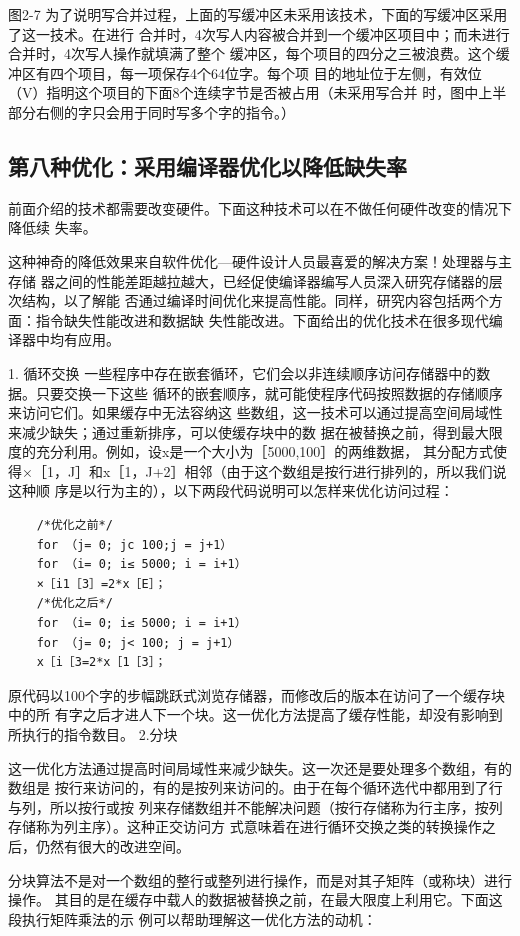 图2-7 为了说明写合并过程，上面的写缓冲区未采用该技术，下面的写缓冲区采用了这一技术。在进行
合并时，4次写人内容被合并到一个缓冲区项目中；而未进行合并时，4次写人操作就填满了整个
缓冲区，每个项目的四分之三被浪费。这个缓冲区有四个项目，每一项保存4个64位字。每个项
目的地址位于左侧，有效位（V）指明这个项目的下面8个连续字节是否被占用（未采用写合并
时，图中上半部分右侧的字只会用于同时写多个字的指令。）

\subsection{第八种优化：采用编译器优化以降低缺失率}
前面介绍的技术都需要改变硬件。下面这种技术可以在不做任何硬件改变的情况下降低续
失率。

这种神奇的降低效果来自软件优化—硬件设计人员最喜爱的解决方案！处理器与主存储
器之间的性能差距越拉越大，已经促使编译器编写人员深入研究存储器的层次结构，以了解能
否通过编译时间优化来提高性能。同样，研究内容包括两个方面：指令缺失性能改进和数据缺
失性能改进。下面给出的优化技术在很多现代编译器中均有应用。

1. 循环交换
一些程序中存在嵌套循环，它们会以非连续顺序访问存储器中的数据。只要交换一下这些
循环的嵌套顺序，就可能使程序代码按照数据的存储顺序来访问它们。如果缓存中无法容纳这
些数组，这一技术可以通过提高空间局域性来减少缺失；通过重新排序，可以使缓存块中的数
据在被替换之前，得到最大限度的充分利用。例如，设x是一个大小为［5000,100］的两维数据，
其分配方式使得×［1，J］和x［1，J+2］相邻（由于这个数组是按行进行排列的，所以我们说这种顺
序是以行为主的），以下两段代码说明可以怎样来优化访问过程：

\begin{verbatim}
    /*优化之前*/
    for （j= 0; jc 100;j = j+1）
    for （i= 0; i≤ 5000; i = i+1）
    ×［i1［3］=2*x［E］；
    /*优化之后*/
    for （i= 0; i≤ 5000; i = i+1）
    for （j= 0; j< 100; j = j+1）
    x［i［3=2*x［1［3］；
\end{verbatim}
原代码以100个字的步幅跳跃式浏览存储器，而修改后的版本在访问了一个缓存块中的所
有字之后才进人下一个块。这一优化方法提高了缓存性能，却没有影响到所执行的指令数目。
2.分块

这一优化方法通过提高时间局域性来减少缺失。这一次还是要处理多个数组，有的数组是
按行来访问的，有的是按列来访问的。由于在每个循环选代中都用到了行与列，所以按行或按
列来存储数组并不能解决问题（按行存储称为行主序，按列存储称为列主序）。这种正交访问方
式意味着在进行循环交换之类的转换操作之后，仍然有很大的改进空间。

分块算法不是对一个数组的整行或整列进行操作，而是对其子矩阵（或称块）进行操作。
其目的是在缓存中载人的数据被替换之前，在最大限度上利用它。下面这段执行矩阵乘法的示
例可以帮助理解这一优化方法的动机：

